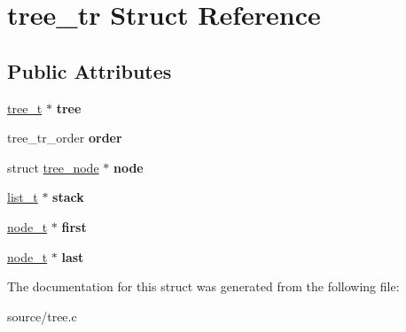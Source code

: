 \hypertarget{structtree__tr}{}\section{tree\+\_\+tr Struct Reference}
\label{structtree__tr}
\subsection*{Public Attributes}
\begin{DoxyCompactItemize}
\item 
\hyperlink{tree_8h_aabd08cfd7893b1b0d401ce689de8c1b7}{tree\+\_\+t} $\ast$ {\bfseries tree}\hypertarget{structtree__tr_a8b8bc8fd11e5d38cf0a166293e6cd737}{}\label{structtree__tr_a8b8bc8fd11e5d38cf0a166293e6cd737}

\item 
tree\+\_\+tr\+\_\+order {\bfseries order}\hypertarget{structtree__tr_a92c5348a3a9a7a768b582a810830e390}{}\label{structtree__tr_a92c5348a3a9a7a768b582a810830e390}

\item 
struct \hyperlink{structtree__node}{tree\+\_\+node} $\ast$ {\bfseries node}\hypertarget{structtree__tr_a529278566d070b7717fbe4aa4c79386b}{}\label{structtree__tr_a529278566d070b7717fbe4aa4c79386b}

\item 
\hyperlink{list_8h_a15376354e4e8b4f1732e9df17f30786c}{list\+\_\+t} $\ast$ {\bfseries stack}\hypertarget{structtree__tr_a0a9d9d286953878a855d75be7af1545c}{}\label{structtree__tr_a0a9d9d286953878a855d75be7af1545c}

\item 
\hyperlink{structtree__node}{node\+\_\+t} $\ast$ {\bfseries first}\hypertarget{structtree__tr_acb981d7d596151ad32bc3baf92dc4b8c}{}\label{structtree__tr_acb981d7d596151ad32bc3baf92dc4b8c}

\item 
\hyperlink{structtree__node}{node\+\_\+t} $\ast$ {\bfseries last}\hypertarget{structtree__tr_a1a4167b92654d6eb8fdf6d331296b945}{}\label{structtree__tr_a1a4167b92654d6eb8fdf6d331296b945}

\end{DoxyCompactItemize}


The documentation for this struct was generated from the following file\+:\begin{DoxyCompactItemize}
\item 
source/tree.\+c\end{DoxyCompactItemize}
